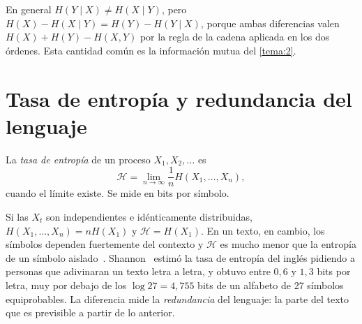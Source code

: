 \addtocounter{definicion}{1}%

\begin{observacion}
En general $H(Y\mid X)\ne H(X\mid Y)$, pero $H(X)-H(X\mid Y)=H(Y)-H(Y\mid X)$, porque ambas diferencias valen $H(X)+H(Y)-H(X,Y)$ por la regla de la cadena aplicada en los dos órdenes. Esta cantidad común es la información mutua del \cref{tema:2}.
\end{observacion}

\section{Tasa de entropía y redundancia del lenguaje}

\begin{definicion}\label{def:tasa}
La \emph{tasa de entropía} de un proceso $X_1,X_2,\dots$ es
\[
\mathcal{H}=\lim_{n\to\infty}\frac1n H(X_1,\dots,X_n),
\]
cuando el límite existe. Se mide en bits por símbolo.
\end{definicion}

Si las $X_t$ son independientes e idénticamente distribuidas, $H(X_1,\dots,X_n)=nH(X_1)$ y $\mathcal{H}=H(X_1)$. En un texto, en cambio, los símbolos dependen fuertemente del contexto y $\mathcal{H}$ es mucho menor que la entropía de un símbolo aislado~\cite[cap.~4]{ct}. Shannon~\cite{shannon51} estimó la tasa de entropía del inglés pidiendo a personas que adivinaran un texto letra a letra, y obtuvo entre $0{,}6$ y $1{,}3$ bits por letra, muy por debajo de los $\log 27=4{,}755$ bits de un alfabeto de 27 símbolos equiprobables. La diferencia mide la \emph{redundancia} del lenguaje: la parte del texto que es previsible a partir de lo anterior.

\addtocounter{definicion}{1}%

